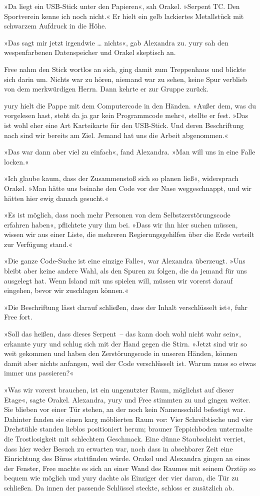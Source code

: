 »Da liegt ein USB-Stick unter den Papieren«, sah Orakel. »Serpent TC. Den Sportverein kenne ich noch nicht.« Er hielt ein gelb lackiertes Metallstück mit schwarzem Aufdruck in die Höhe.

»Das sagt mir jetzt irgendwie … nichts«, gab Alexandra zu. yury sah den wespenfarbenen Datenspeicher und Orakel skeptisch an.

Free nahm den Stick wortlos an sich, ging damit zum Treppenhaus und blickte sich darin um. Nichts war zu hören, niemand war zu sehen, keine Spur verblieb von dem merkwürdigen Herrn. Dann kehrte er zur Gruppe zurück.

yury hielt die Pappe mit dem Computercode in den Händen. »Außer dem, was du vorgelesen hast, steht da ja gar kein Programmcode mehr«, stellte er fest. »Das ist wohl eher eine Art Karteikarte für den USB-Stick. Und deren Beschriftung nach sind wir bereits am Ziel. Jemand hat uns die Arbeit abgenommen.«

»Das war dann aber viel zu einfach«, fand Alexandra. »Man will uns in eine Falle locken.«

»Ich glaube kaum, dass der Zusammenstoß sich so planen ließ«, widersprach Orakel. »Man hätte uns beinahe den Code vor der Nase weggeschnappt, und wir hätten hier ewig danach gesucht.«

»Es ist möglich, dass noch mehr Personen von dem Selbstzerstörungscode erfahren haben«, pflichtete yury ihm bei. »Dass wir ihn hier suchen müssen, wissen wir aus einer Liste, die mehreren Regierungsgehilfen über die Erde verteilt zur Verfügung stand.«

»Die ganze Code-Suche ist eine einzige Falle«, war Alexandra überzeugt. »Uns bleibt aber keine andere Wahl, als den Spuren zu folgen, die da jemand für uns ausgelegt hat. Wenn Island mit uns spielen will, müssen wir vorerst darauf eingehen, bevor wir zuschlagen können.«

»Die Beschriftung lässt darauf schließen, dass der Inhalt verschlüsselt ist«, fuhr Free fort.

»Soll das heißen, dass dieses Serpent~– das kann doch wohl nicht wahr sein«, erkannte yury und schlug sich mit der Hand gegen die Stirn. »Jetzt sind wir so weit gekommen und haben den Zerstörungscode in unseren Händen, können damit aber nichts anfangen, weil der Code verschlüsselt ist. Warum muss so etwas immer uns passieren?«

»Was wir vorerst brauchen, ist ein ungenutzter Raum, möglichst auf dieser Etage«, sagte Orakel. Alexandra, yury und Free stimmten zu und gingen weiter. Sie blieben vor einer Tür stehen, an der noch kein Namensschild befestigt war. Dahinter fanden sie einen karg möblierten Raum vor: Vier Schreibtische und vier Drehstühle standen lieblos positioniert herum; brauner Teppichboden untermalte die Trostlosigkeit mit schlechtem Geschmack. Eine dünne Staubschicht verriet, dass hier weder Besuch zu erwarten war, noch dass in absehbarer Zeit eine Einrichtung des Büros stattfinden würde. Orakel und Alexandra gingen an eines der Fenster, Free machte es sich an einer Wand des Raumes mit seinem Örztöp so bequem wie möglich und yury dachte als Einziger der vier daran, die Tür zu schließen. Da innen der passende Schlüssel steckte, schloss er zusätzlich ab.

